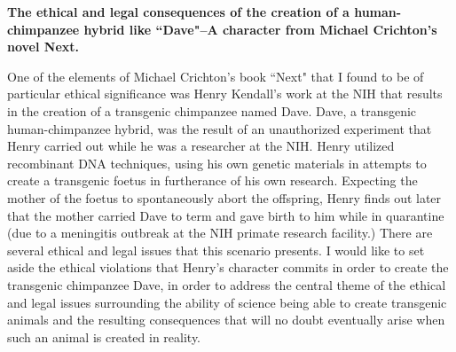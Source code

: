 \documentclass[letterpaper,10pt,twoside]{article}
\begin{document}
\begin{center}
\textbf{\large{The ethical and legal consequences of the creation of a human-chimpanzee hybrid like ``Dave"--A character from Michael Crichton's novel Next.}}
\end{center}
\vspace{0.5em}

One of the elements of Michael Crichton's book ``Next" that I found to be of particular ethical significance was Henry Kendall's work at the NIH that results in the creation of a transgenic chimpanzee named Dave.  Dave, a transgenic human-chimpanzee hybrid, was the result of an unauthorized experiment that Henry carried out while he was a researcher at the NIH.  Henry utilized recombinant DNA techniques, using his own genetic materials in attempts to create a transgenic foetus in furtherance of his own research.  Expecting the mother of the foetus to spontaneously abort the offspring, Henry finds out later that the mother carried Dave to term and gave birth to him while in quarantine (due to a meningitis outbreak at the NIH primate research facility.)  There are several ethical and legal issues that this scenario presents.  I would like to set aside the ethical violations that Henry's character commits in order to create the transgenic chimpanzee Dave, in order to address the central theme of the ethical and legal issues surrounding the ability of science being able to create transgenic animals and the resulting consequences that will no doubt eventually arise when such an animal is created in reality.
\end{document}

